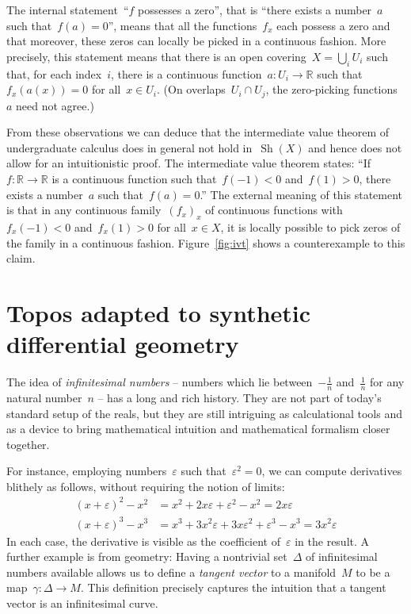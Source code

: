 \documentclass[oneside,reqno]{amsart}
\theoremstyle{definition}
\theoremstyle{plain}
\theoremstyle{remark}
\newcommand{\RR}{\mathbb{R}}
\DeclareMathOperator{\Sh}{Sh}
\renewcommand{\_}{\mathpunct{.}\,}
\newcommand{\?}{\,{:}\,}
\begin{document}
The internal statement~``$f$ possesses a zero'', that is ``there exists a
number~$a$ such that~$f(a) = 0$'', means that all the functions~$f_x$ each
possess a zero and that moreover, these zeros can locally be picked in a
continuous fashion. More precisely, this statement means that there is an open
covering~$X = \bigcup_i U_i$ such that, for each index~$i$, there is a continuous
function~$a : U_i \to \RR$ such that~$f_x(a(x)) = 0$ for all~$x \in U_i$. (On
overlaps~$U_i \cap U_j$, the zero-picking functions~$a$ need not agree.)

From these observations we can deduce that the intermediate value theorem of
undergraduate calculus does in general not hold in~$\Sh(X)$ and hence does not allow
for an intuitionistic proof. The intermediate value theorem states: ``If~$f : \RR \to \RR$
is a continuous function such that~$f(-1) < 0$ and~$f(1) > 0$, there exists a
number~$a$ such that~$f(a) = 0$.'' The external meaning of this statement is
that in any continuous family~$(f_x)_x$ of continuous functions with~$f_x(-1) <
0$ and~$f_x(1) > 0$ for all~$x \in X$, it is locally possible to pick zeros of
the family in a continuous fashion. Figure~\ref{fig:ivt} shows a counterexample
to this claim.


\section{Topos adapted to synthetic differential geometry}
\label{sect:smooth}

The idea of \emph{infinitesimal numbers} -- numbers which lie between~$-\frac{1}{n}$
and~$\frac{1}{n}$ for any natural number~$n$ -- has a long and rich history. They are
not part of today's standard setup of the reals, but they are still intriguing
as calculational tools and as a device to bring mathematical intuition and
mathematical formalism closer together.

For instance, employing numbers~$\varepsilon$ such that~$\varepsilon^2 = 0$, we can
compute derivatives blithely as follows, without requiring the notion of
limits:
\begin{equation}\label{eq:derivative}\tag{$\star$}
  \begin{aligned}
    (x + \varepsilon)^2 - x^2 &= x^2 + 2x\varepsilon + \varepsilon^2 - x^2 = 2x\varepsilon \\
    (x + \varepsilon)^3 - x^3 &= x^3 + 3x^2\varepsilon + 3x\varepsilon^2 + \varepsilon^3 - x^3 = 3x^2\varepsilon
  \end{aligned}
\end{equation}
In each case, the derivative is visible as the coefficient of~$\varepsilon$ in
the result. A further example is from geometry: Having a nontrivial
set~$\Delta$ of infinitesimal numbers available allows us to define a
\emph{tangent vector} to a manifold~$M$ to be a map~$\gamma : \Delta \to M$. This
definition precisely captures the intuition that a tangent vector is an
infinitesimal curve.
\end{document}

